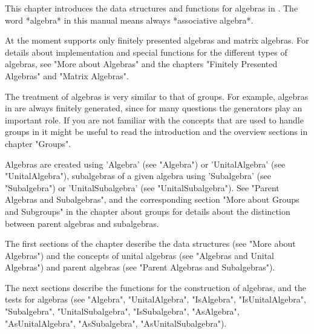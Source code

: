 \def\MeatAxe{\sf MeatAxe}

This chapter introduces the data structures and functions for algebras
in {\GAP}.  The word *algebra* in this manual means always *associative
algebra*.

At the moment {\GAP} supports only finitely presented algebras and
matrix algebras.  For details about implementation and special functions for
the different types of algebras, see "More about Algebras" and the chapters
"Finitely Presented Algebras" and "Matrix Algebras".

The treatment of algebras is very similar to that of groups.  For
example, algebras in {\GAP} are always finitely generated, since for many
questions the generators play an important role.
If you are not familiar with the concepts that are used to handle groups
in {\GAP} it might be useful to read the introduction and the overview
sections in chapter "Groups".

Algebras are created using 'Algebra' (see "Algebra") or 'UnitalAlgebra'
(see "UnitalAlgebra"), subalgebras of a given algebra using 'Subalgebra'
(see "Subalgebra") or 'UnitalSubalgebra' (see "UnitalSubalgebra").
See "Parent Algebras and Subalgebras", and the corresponding section
"More about Groups and Subgroups" in the chapter about groups for details
about the distinction between parent algebras and subalgebras.

The first sections of the chapter describe the data structures (see "More
about Algebras") and the concepts of unital algebras (see "Algebras and
Unital Algebras") and parent algebras (see "Parent Algebras and
Subalgebras").

The next sections describe the functions for the construction of
algebras, and the tests for algebras (see "Algebra", "UnitalAlgebra",
"IsAlgebra", "IsUnitalAlgebra", "Subalgebra", "UnitalSubalgebra",
"IsSubalgebra", "AsAlgebra", "AsUnitalAlgebra", "AsSubalgebra",
"AsUnitalSubalgebra").

